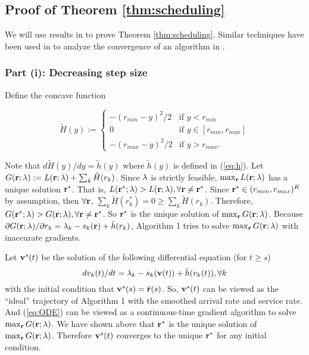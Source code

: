 \documentclass{IEEEtran}
\begin{document}
\subsection{\label{sub:Proof-of-Theorem}Proof of Theorem \ref{thm:scheduling}}

We will use results in \cite{Borkar} to prove Theorem \ref{thm:scheduling}.
Similar techniques have been used in \cite{conv_MS} to analyze the
convergence of an algorithm in \cite{Allerton}.


\subsubsection{Part (i): Decreasing step size}

Define the concave function

\begin{equation}
\tilde{H}(y):=\begin{cases}
-(r_{min}-y)^{2}/2 & \text{if }y<r_{min}\\
0 & \text{if }y\in[r_{min},r_{max}]\\
-(r_{max}-y)^{2}/2 & \text{if }y>r_{max}.\end{cases}\label{eq:H}\end{equation}


Note that $d\tilde{H}(y)/dy=\tilde{h}(y)$ where $\tilde{h}(y)$ is
defined in (\ref{eq:h}). Let $G({\bf r};{\bf \lambda}):=L({\bf r};{\bf \lambda})+\sum_{k}\tilde{H}(r_{k})$.
Since ${\bf \lambda}$ is strictly feasible, $\max_{{\bf r}}L({\bf r};{\bf \lambda})$
has a unique solution ${\bf r}^{*}$. That is, $L({\bf r}^{*};{\bf \lambda})>L({\bf r};{\bf \lambda}),\forall{\bf r}\ne{\bf r}^{*}$.
Since ${\bf r}^{*}\in(r_{min},r_{max})^{K}$ by assumption, then $\forall{\bf r}$,
$\sum_{k}\tilde{H}(r_{k}^{*})=0\ge\sum_{k}\tilde{H}(r_{k})$. Therefore,
$G({\bf r}^{*};{\bf \lambda})>G({\bf r};{\bf \lambda}),\forall{\bf r}\ne{\bf r}^{*}$.
So ${\bf r}^{*}$ is the unique solution of $\max_{{\bf r}}G({\bf r};{\bf \lambda})$.
Because $\partial G({\bf r};{\bf \lambda})/\partial r_{k}=\lambda_{k}-s_{k}({\bf r})+\tilde{h}(r_{k})$,
Algorithm 1 tries to solve $\max_{{\bf r}}G({\bf r};{\bf \lambda})$
with inaccurate gradients. 

Let ${\bf v}^{s}(t)$ be the solution of the following differential
equation (for $t\ge s$) \begin{equation}
dv_{k}(t)/dt=\lambda_{k}-s_{k}({\bf v}(t))+\tilde{h}(v_{k}(t)),\forall k\label{eq:ODE}\end{equation}
with the initial condition that ${\bf v}^{s}(s)=\bar{{\bf r}}(s)$.
So, ${\bf v}^{s}(t)$ can be viewed as the {}``ideal'' trajectory
of Algorithm 1 with the smoothed arrival rate and service rate. And
(\ref{eq:ODE}) can be viewed as a continuous-time gradient algorithm
to solve $\max_{{\bf r}}G({\bf r};{\bf \lambda})$. We have shown
above that ${\bf r}^{*}$ is the unique solution of $\max_{{\bf r}}G({\bf r};{\bf \lambda})$.
Therefore ${\bf v}^{s}(t)$ converges to the unique ${\bf r}^{*}$
for any initial condition.
\end{document}
